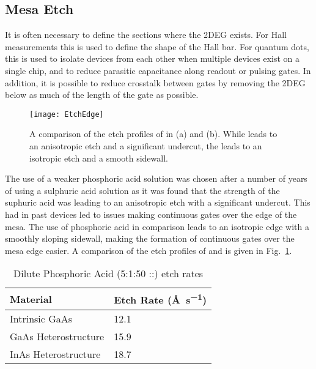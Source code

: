 \subsection{Mesa Etch}
\label{sec:mesaetch}
It is often necessary to define the sections where the 2DEG exists. For Hall measurements this is used to define the shape of the Hall bar.
For quantum dots, this is used to isolate devices from each other when multiple devices exist on a single chip, and to reduce parasitic
capacitance along readout or pulsing gates. In addition, it is possible to reduce crosstalk between gates by removing the 2DEG below
as much of the length of the gate as possible\cite{doi:10.1063/1.4752863}.

\begin{figure}
    \texttt{[image: EtchEdge]}
    \caption[Etch profile of  and ]
    {\label{fig:etchedge}A comparison of the etch profiles of  in (a) and  (b). While  leads
    to an anisotropic etch and a significant undercut, the  leads to an isotropic etch and a smooth sidewall.}
\end{figure}

The use of a weaker phosphoric acid solution was chosen after a number of years of using a sulphuric acid solution as it was found that the
strength of the suphuric acid was leading to an anisotropic etch with a significant undercut. This had in past devices led to issues making
continuous gates over the edge of the mesa. The use of phosphoric acid in comparison leads to
an isotropic edge with a smoothly sloping sidewall, making the formation of continuous gates over the mesa edge easier.
A comparison of the etch profiles of  and  is given in Fig.~\ref{fig:etchedge}.

\begin{table}
    \centering
    \begin{tabular}{|l|l|}
        \hline
        Material & Etch Rate (\si{\angstrom\per\second}) \\
        \hline
        Intrinsic GaAs & 12.1 \\ \hline
        GaAs Heterostructure & 15.9 \\ \hline
        InAs Heterostructure & 18.7 \\
        \hline
    \end{tabular}
    \caption[Dilute Phosphoric Acid (5:1:50 ::) etch rates]
    {Dilute Phosphoric Acid (5:1:50 ::) etch rates}
    \label{tab:etchratess}
\end{table}

